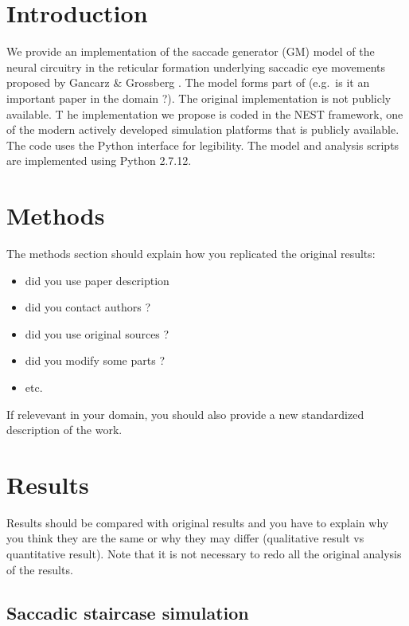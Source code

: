 \documentclass[10pt,a4paper,onecolumn]{article}
\newcommand{\tightlist}{%
  \setlength{\itemsep}{1pt}\setlength{\parskip}{0pt}\setlength{\parsep}{0pt}}
\begin{document}
\section{Introduction}\label{introduction}

We provide an implementation of the saccade generator (GM) model of the
neural circuitry in the reticular formation underlying saccadic eye
movements proposed by Gancarz \& Grossberg \autocite{Gancarz1998}. The
model forms part of (e.g.~is it an important paper in the domain ?). The
original implementation is not publicly available. T he implementation
we propose is coded in the NEST \autocite{Gewaltig2007} framework, one
of the modern actively developed simulation platforms that is publicly
available. The code uses the Python interface \autocite{Eppler2008} for
legibility. The model and analysis scripts are implemented using Python
2.7.12.

\section{Methods}\label{methods}

The methods section should explain how you replicated the original
results:

\begin{itemize}
\tightlist
\item
  did you use paper description
\item
  did you contact authors ?
\item
  did you use original sources ?
\item
  did you modify some parts ?
\item
  etc.
\end{itemize}

If relevevant in your domain, you should also provide a new standardized
description of the work.

\section{Results}\label{results}

Results should be compared with original results and you have to explain
why you think they are the same or why they may differ (qualitative
result vs quantitative result). Note that it is not necessary to redo
all the original analysis of the results.

\subsection{Saccadic staircase
simulation}\label{saccadic-staircase-simulation}
\end{document}
